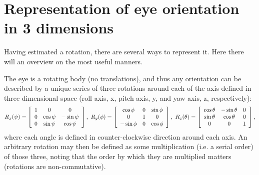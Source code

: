 
\section{Representation of eye orientation in 3 dimensions}
\label{cha2:represent}

Having estimated a rotation, there are several ways to represent it. Here there will an overview on the most useful manners.

The eye is a rotating body (no translations), and thus any orientation can be described by a unique series of three rotations around each of the axis defined in three dimensional space (roll axis, x, pitch axis, y, and yaw axis, z, respectively):
\begin{equation}
\label{rrr}
R _ { x } ( \psi ) = \left[ \begin{array} { c c c } { 1 } & { 0 } & { 0 } \\ { 0 } & { \cos \psi } & { - \sin \psi } \\ { 0 } & { \sin \psi } & { \cos \psi} \end{array} \right], \
R _ { y } ( \phi ) = \left[ \begin{array} { c c c } { \cos \phi } & { 0 } & { \sin \phi } \\ { 0 } & { 1 } & { 0 } \\ { - \sin \phi } & { 0 } & { \cos \phi } \end{array} \right], \
R _ { z } ( \theta ) = \left[ \begin{array} { c c c } { \cos \theta } & { - \sin \theta } & { 0 } \\ { \sin \theta } & { \cos \theta } & { 0 } \\ { 0 } & { 0 } & { 1 } \end{array} \right],
\end{equation}
where each angle is defined in counter-clockwise direction around each axis. An arbitrary rotation may then be defined as some multiplication (i.e. a serial order) of those three, noting that the order by which they are multiplied matters (rotations are non-commutative). 

